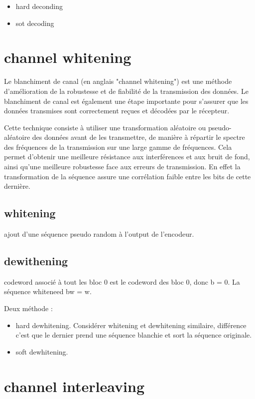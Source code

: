 \documentclass[12pt,a4paper,oneside, titlepage]{report}
\begin{document}
\begin{itemize}
\item hard deconding
\item sot decoding
\end{itemize}

\section{channel whitening}

Le blanchiment de canal (en anglais "channel whitening") est une méthode d'amélioration de la robustesse et de fiabilité de la transmission des données. Le blanchiment de canal est également une étape importante pour s'assurer que les données transmises sont correctement reçues et décodées par le récepteur.

Cette technique consiste à utiliser une transformation aléatoire ou pseudo-aléatoire des données avant de les transmettre, de manière à répartir le spectre des fréquences de la transmission sur une large gamme de fréquences. Cela permet d'obtenir une meilleure résistance aux interférences et aux bruit de fond, ainsi qu'une meilleure robustesse face aux erreurs de transmission. En effet la transformation de la séquence assure une corrélation faible entre les bits de cette dernière.

\subsection{whitening}

ajout d'une séquence pseudo random à l'output de l'encodeur.

\subsection{dewithening}

codeword associé à tout les bloc 0 est le codeword des bloc 0, donc b = 0. La séquence whiteneed bw = w.

Deux méthode :

\begin{itemize}
\item hard dewhitening. Considérer whitening et dewhitening similaire, différence c'est que le dernier prend une séquence blanchie et sort la séquence originale.
\item soft dewhitening. 
\end{itemize}


\section{channel interleaving}
\end{document}
